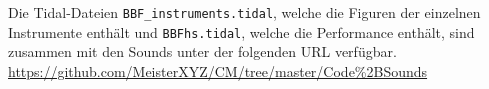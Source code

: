 \documentclass[
10pt, %
a4paper, %
oneside, %
headinclude,footinclude, %
BCOR5mm, %
]{scrartcl}
\begin{document}
\noindent Die Tidal-Dateien \verb|BBF_instruments.tidal|, welche die Figuren der einzelnen Instrumente enthält und \verb|BBFhs.tidal|, welche die Performance enthält, sind zusammen mit den Sounds unter der folgenden URL verfügbar. \\
\url{https://github.com/MeisterXYZ/CM/tree/master/Code%2BSounds}
	
\pagebreak




\renewcommand{\refname}{\spacedlowsmallcaps{Literatur/Quellen}} %




\end{document}
